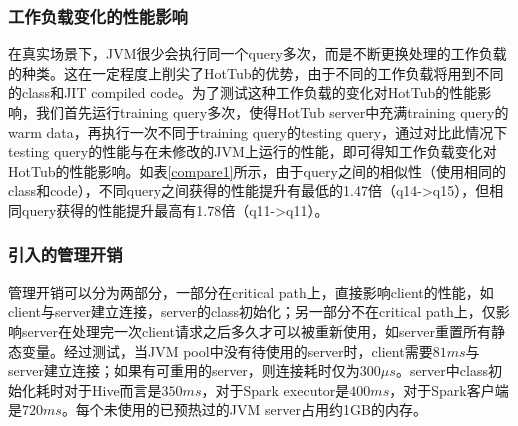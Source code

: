 \documentclass[lang=cn,12pt,a4paper,cite=authoryear]{elegantpaper}
\begin{document}
\subsubsection{工作负载变化的性能影响}
在真实场景下，JVM很少会执行同一个query多次，而是不断更换处理的工作负载的种类。这在一定程度上削尖了HotTub的优势，由于不同的工作负载将用到不同的class和JIT compiled code。为了测试这种工作负载的变化对HotTub的性能影响，我们首先运行training query多次，使得HotTub server中充满training query的warm data，再执行一次不同于training query的testing query，通过对比此情况下testing query的性能与在未修改的JVM上运行的性能，即可得知工作负载变化对HotTub的性能影响。如表\ref{compare1}所示，由于query之间的相似性（使用相同的class和code），不同query之间获得的性能提升有最低的1.47倍（q14->q15），但相同query获得的性能提升最高有1.78倍（q11->q11）。

\begin{table}
  \centering
	\caption{Spark query的不同对HotTub性能优化的影响程度}		
	\label{compare1}
\end{table}    

\subsubsection{引入的管理开销}
管理开销可以分为两部分，一部分在critical path上，直接影响client的性能，如client与server建立连接，server的class初始化；另一部分不在critical path上，仅影响server在处理完一次client请求之后多久才可以被重新使用，如server重置所有静态变量。经过测试，当JVM pool中没有待使用的server时，client需要$81ms$与server建立连接；如果有可重用的server，则连接耗时仅为$300\mu{}s$。server中class初始化耗时对于Hive而言是$350ms$，对于Spark executor是$400ms$，对于Spark客户端是$720ms$。每个未使用的已预热过的JVM server占用约1GB的内存。
\end{document}
